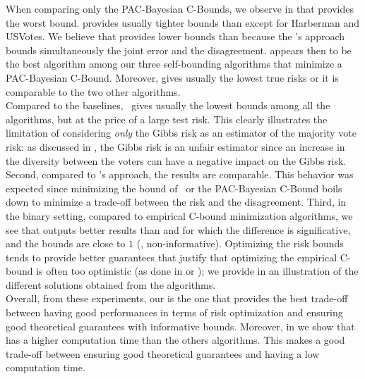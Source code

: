 When comparing only the PAC-Bayesian C-Bounds, we observe in  that  provides the worst bound.
 provides usually tighter bounds than  except for Harberman and USVotes.
We believe that  provides lower bounds than  because the \citeauthor{LacasseLavioletteMarchandGermainUsunier2006}'s approach bounds simultaneously the joint error and the disagreement.
 appears then to be the best algorithm among our three self-bounding algorithms that minimize a PAC-Bayesian C-Bound.
Moreover,  gives usually the lowest true risks or it is comparable to the two other algorithms.\\

Compared to the baselines, \algogermain~gives usually the lowest bounds among all the algorithms, but at the price of a large test risk.
This clearly illustrates the limitation of considering \textit{only} the Gibbs risk as an estimator of the majority vote risk: as discussed in , the Gibbs risk is an unfair estimator since an increase in the diversity between the voters can have a negative impact on the Gibbs risk.\\
Second, compared to \citeauthor{MasegosaLorenzenIgelSeldin2020}'s approach, the results are comparable.
This behavior was expected since minimizing the bound of~\citet{MasegosaLorenzenIgelSeldin2020} or the PAC-Bayesian C-Bound boils down to minimize a trade-off between the risk and the disagreement.
Third, in the binary setting, compared to empirical C-bound minimization algorithms, we see that  outputs better results than \cbboost and \mincq for which the difference is significative, and the bounds are close to $1$ (\ie, non-informative).
Optimizing the risk bounds tends to provide better guarantees that justify that optimizing the empirical C-bound is often too optimistic (as done in \cbboost or \mincq); we provide in  an illustration of the different solutions obtained from the algorithms.\\

Overall, from these experiments, our  is the one that provides the best trade-off between having good performances in terms of risk optimization and ensuring good theoretical guarantees with informative bounds.
Moreover, in  we show that  has a higher computation time than the others algorithms.
This makes  a good trade-off between ensuring good theoretical guarantees and having a low computation time.


